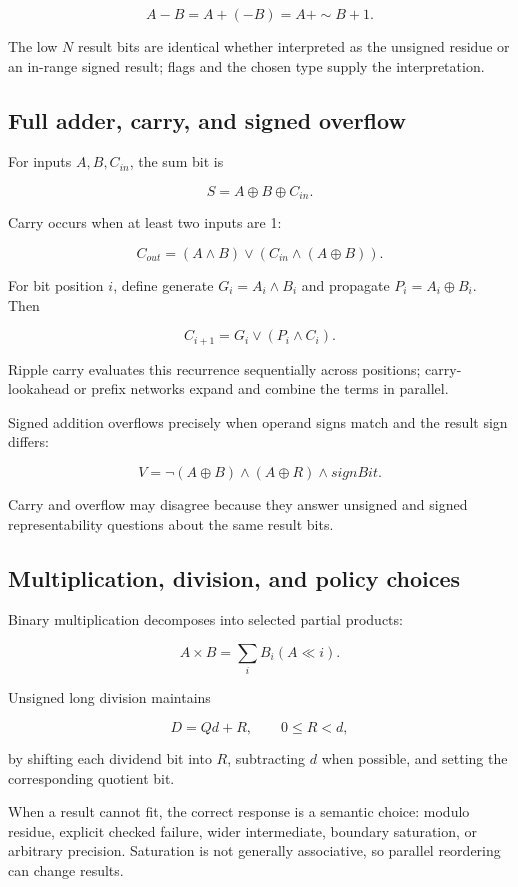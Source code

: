 \[
A-B=A+(-B)=A+\sim B+1.
\]

The low \(N\) result bits are identical whether interpreted as the unsigned residue or an in-range signed result; flags and the chosen type supply the interpretation.

\subsection{Full adder, carry, and signed overflow}\label{03-visual-computing-i-ch018-full-adder-carry-and-signed-overflow}

For inputs \(A,B,C_{in}\), the sum bit is

\[
S=A\oplus B\oplus C_{in}.
\]

Carry occurs when at least two inputs are 1:

\[
C_{out}=(A\land B)\lor(C_{in}\land(A\oplus B)).
\]

For bit position \(i\), define generate \(G_i=A_i\land B_i\) and propagate \(P_i=A_i\oplus B_i\). Then

\[
C_{i+1}=G_i\lor(P_i\land C_i).
\]

Ripple carry evaluates this recurrence sequentially across positions; carry-lookahead or prefix networks expand and combine the terms in parallel.

Signed addition overflows precisely when operand signs match and the result sign differs:

\[
V=\neg(A\oplus B)\land(A\oplus R)\land signBit.
\]

Carry and overflow may disagree because they answer unsigned and signed representability questions about the same result bits.

\subsection{Multiplication, division, and policy choices}\label{03-visual-computing-i-ch018-multiplication-division-and-policy-choices}

Binary multiplication decomposes into selected partial products:

\[
A\times B=\sum_i B_i(A\ll i).
\]

Unsigned long division maintains

\[
D=Qd+R,\qquad 0\le R<d,
\]

by shifting each dividend bit into \(R\), subtracting \(d\) when possible, and setting the corresponding quotient bit.

When a result cannot fit, the correct response is a semantic choice: modulo residue, explicit checked failure, wider intermediate, boundary saturation, or arbitrary precision. Saturation is not generally associative, so parallel reordering can change results.

